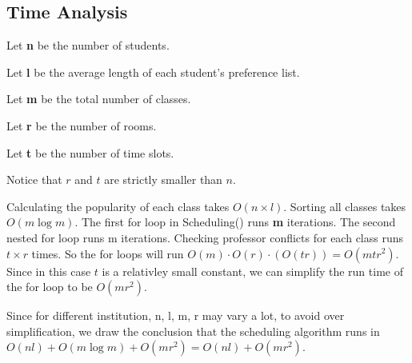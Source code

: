 \documentclass[11pt, oneside]{article}   	%
\begin{document}
\subsection{Time Analysis}
Let \textbf{n} be the number of students. 

Let \textbf{l} be the average length of each student's preference list.

Let \textbf{m} be the total number of classes. 

Let \textbf{r} be the number of rooms. 

Let \textbf{t} be the number of time slots. 

Notice that $r$ and $t$ are strictly smaller than $n$.

Calculating the popularity of each class takes $O(n \times l)$. Sorting all classes takes $O(m\log m)$. The first for loop in Scheduling() runs \textbf{m} iterations. 
The second nested for loop runs m iterations.
Checking professor conflicts for each class runs $t \times r$ times. 
So the for loops will run $O(m) \cdot O(r) \cdot (O(tr)) = O(mtr^2)$. Since in this case $t$ is a relativley small constant, we can simplify the run time of the for loop to be $O(mr^2)$. 

Since for different institution, n, l, m, r may vary a lot, to avoid over simplification, we draw the conclusion that the scheduling algorithm runs in $O(nl) + O(m\log m) + O(mr^2) = O(nl) + O(mr^2)$.



\end{document}
